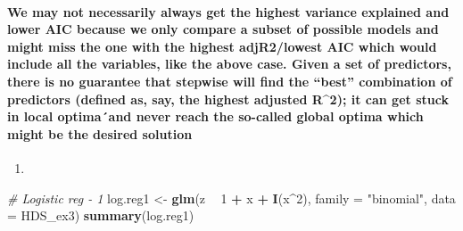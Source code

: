 \documentclass[]{article}
\newenvironment{Shaded}{\begin{snugshade}}{\end{snugshade}}
\newcommand{\CommentTok}[1]{\textcolor[rgb]{0.56,0.35,0.01}{\textit{#1}}}
\newcommand{\DataTypeTok}[1]{\textcolor[rgb]{0.13,0.29,0.53}{#1}}
\newcommand{\DecValTok}[1]{\textcolor[rgb]{0.00,0.00,0.81}{#1}}
\newcommand{\KeywordTok}[1]{\textcolor[rgb]{0.13,0.29,0.53}{\textbf{#1}}}
\newcommand{\NormalTok}[1]{#1}
\newcommand{\OperatorTok}[1]{\textcolor[rgb]{0.81,0.36,0.00}{\textbf{#1}}}
\newcommand{\StringTok}[1]{\textcolor[rgb]{0.31,0.60,0.02}{#1}}
\let\oldparagraph\paragraph
\renewcommand{\paragraph}[1]{\oldparagraph{#1}\mbox{}}
\begin{document}
\hypertarget{we-may-not-necessarily-always-get-the-highest-variance-explained-and-lower-aic-because-we-only-compare-a-subset-of-possible-models-and-might-miss-the-one-with-the-highest-adjr2lowest-aic-which-would-include-all-the-variables-like-the-above-case.-given-a-set-of-predictors-there-is-no-guarantee-that-stepwise-will-find-the-best-combination-of-predictors-defined-as-say-the-highest-adjusted-r2-it-can-get-stuck-in-local-optimaand-never-reach-the-so-called-global-optima-which-might-be-the-desired-solution}{%
\paragraph{We may not necessarily always get the highest variance
explained and lower AIC because we only compare a subset of possible
models and might miss the one with the highest adjR2/lowest AIC which
would include all the variables, like the above case. Given a set of
predictors, there is no guarantee that stepwise will find the ``best''
combination of predictors (defined as, say, the highest adjusted
R\^{}2); it can get stuck in local optima´and never reach the so-called
global optima which might be the desired
solution}\label{we-may-not-necessarily-always-get-the-highest-variance-explained-and-lower-aic-because-we-only-compare-a-subset-of-possible-models-and-might-miss-the-one-with-the-highest-adjr2lowest-aic-which-would-include-all-the-variables-like-the-above-case.-given-a-set-of-predictors-there-is-no-guarantee-that-stepwise-will-find-the-best-combination-of-predictors-defined-as-say-the-highest-adjusted-r2-it-can-get-stuck-in-local-optimaand-never-reach-the-so-called-global-optima-which-might-be-the-desired-solution}}

\begin{enumerate}
\def\labelenumi{(\alph{enumi})}
\setcounter{enumi}{1}
\item
\end{enumerate}

\begin{Shaded}
\begin{Highlighting}[]
\CommentTok{# Logistic reg - 1}
\NormalTok{log.reg1 <-}\StringTok{ }\KeywordTok{glm}\NormalTok{(z }\OperatorTok{~}\StringTok{ }\DecValTok{1} \OperatorTok{+}\StringTok{ }\NormalTok{x }\OperatorTok{+}\StringTok{ }\KeywordTok{I}\NormalTok{(x}\OperatorTok{^}\DecValTok{2}\NormalTok{), }\DataTypeTok{family =} \StringTok{"binomial"}\NormalTok{, }\DataTypeTok{data =}\NormalTok{ HDS_ex3)}
\KeywordTok{summary}\NormalTok{(log.reg1)}
\end{Highlighting}
\end{Shaded}
\end{document}
